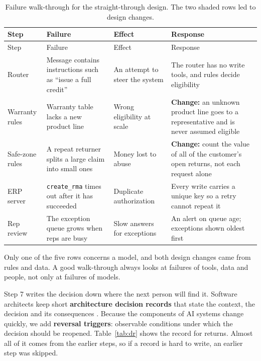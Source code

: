 \begingroup
\small
\begin{xltabular}{\textwidth}{@{}>{\raggedright\arraybackslash}p{2.0cm}>{\raggedright\arraybackslash}X>{\raggedright\arraybackslash}X>{\raggedright\arraybackslash}X@{}}
\caption{Failure walk-through for the straight-through design. The two shaded rows led to design changes.}\label{tab:failwalk}\\
\toprule
{} Step & Failure & Effect & Response \\
\midrule
\endfirsthead
\toprule
{} Step & Failure & Effect & Response \\
\midrule
\endhead
Router & Message contains instructions such as ``issue a full credit'' & An attempt to steer the system & The router has no write tools, and rules decide eligibility \\
 Warranty rules & Warranty table lacks a new product line & Wrong eligibility at scale & \textbf{Change:} an unknown product line goes to a representative and is never assumed eligible \\
 Safe-zone rules & A repeat returner splits a large claim into small ones & Money lost to abuse & \textbf{Change:} count the value of all of the customer's open returns, not each request alone \\
ERP server & \texttt{create\_rma} times out after it has succeeded & Duplicate authorization & Every write carries a unique key so a retry cannot repeat it \\
Rep review & The exception queue grows when reps are busy & Slow answers for exceptions & An alert on queue age; exceptions shown oldest first \\
\bottomrule
\end{xltabular}
\endgroup

\begin{keyidea}
Only one of the five rows concerns a model, and both design changes came from rules and data. A good walk-through always looks at failures of tools, data and people, not only at failures of models.
\end{keyidea}

\label{sec:decision-record}
Step 7 writes the decision down where the next person will find it. Software architects keep short \textbf{architecture decision records} that state the context, the decision and its consequences \citep{nygard2011adr}. Because the components of AI systems change quickly, we add \textbf{reversal triggers}: observable conditions under which the decision should be reopened. Table~\ref{tab:dr} shows the record for returns. Almost all of it comes from the earlier steps, so if a record is hard to write, an earlier step was skipped.

